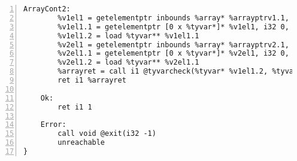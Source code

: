 \begin{lstlisting}[frame=single,numbers=left, language={[x86masm]Assembler}, caption={[Pair Structure: LLVM]Translation of the Pair structure.},
label=llvm:polymorphic]
	ArrayCont2:
		%v1el1 = getelementptr inbounds %array* %arrayptrv1.1, i32 0, i32 1
		%v1el1.1 = getelementptr [0 x %tyvar*]* %v1el1, i32 0, i32 0
		%v1el1.2 = load %tyvar** %v1el1.1
		%v2el1 = getelementptr inbounds %array* %arrayptrv2.1, i32 0, i32 1
		%v2el1.1 = getelementptr [0 x %tyvar*]* %v2el1, i32 0, i32 0
		%v2el1.2 = load %tyvar** %v2el1.1
		%arrayret = call i1 @tyvarcheck(%tyvar* %v1el1.2, %tyvar* %v2el1.2)
		ret i1 %arrayret

	Ok:
		ret i1 1

	Error:
		call void @exit(i32 -1)
  		unreachable
}
\end{lstlisting}
